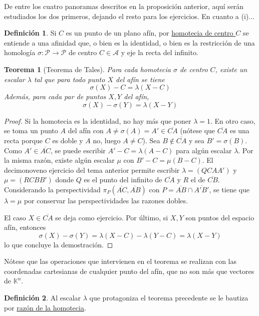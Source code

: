 \documentclass[12pt]{report}
\newtheorem{theorem}{Teorema}[chapter]
\theoremstyle{definition}
\newtheorem{definition}{Definición}[chapter]
\theoremstyle{definition}
\theoremstyle{remark}
\begin{document}
De entre los cuatro panoramas descritos en la proposición anterior, aquí serán estudiados los dos primeros, dejando el resto para los ejercicios. En cuanto a (i)...

\begin{definition}
Si $C$ es un punto de un plano afín, por \ul{homotecia de centro $C$} se entiende a una afinidad que, o bien es la identidad, o bien es la restricción de una homología $\sigma \colon \mathcal{P} \to \mathcal{P}$ de centro $C \in \mathcal{A}$ y eje la recta del infinito.
\end{definition}

\begin{theorem}[Teorema de Tales]
Para cada homotecia $\sigma$ de centro $C$, existe un escalar $\lambda$ tal que para todo punto $X$ del afín se tiene
\[\sigma(X) - C = \lambda(X - C)\]
Además, para cada par de puntos $X,Y$ del afín,
\[\sigma(X)-\sigma(Y)=\lambda(X-Y)\]
\end{theorem}

\begin{proof}
Si la homotecia es la identidad, no hay más que poner $\lambda = 1$. En otro caso, se toma un punto $A$ del afín con $A \neq \sigma(A) =A' \in \overline{CA}$ (nótese que $\overline{CA}$ es una recta porque $C$ es doble y $A$ no, luego $A \neq C$). Sea $B \notin \overline{CA}$ y sea $B' = \sigma(B)$. Como $A' \in \overline{AC}$, se puede escribir $A' - C= \lambda(A-C)$ para algún escalar $\lambda$. Por la misma razón, existe algún escalar $\mu$ con $B'-C=\mu(B-C)$. El decimonoveno ejercicio del tema anterior permite escribir $\lambda = (QCAA')$ y $\mu = (RCBB')$ donde $Q$ es el punto del infinito de $\overline{CA}$ y $R$ el de $\overline{CB}$. Considerando la perspectividad $\pi_P(\overline{AC}, \overline{AB})$ con $P = \overline{AB} \cap \overline{A'B'}$, se tiene que $\lambda = \mu$ por conservar las perspectividades las razones dobles. 

\vspace{2mm}
El caso $X \in \overline{CA}$ se deja como ejercicio. Por último, si $X,Y$ son puntos del espacio afín, entonces
\[\sigma(X)-\sigma(Y)=\lambda(X-C)-\lambda(Y-C)=\lambda(X-Y)\]
lo que concluye la demostración.
\end{proof}

Nótese que las operaciones que intervienen en el teorema se realizan con las coordenadas cartesianas de cualquier punto del afín, que no son más que vectores de $\mathbb{K}^n$.

\begin{definition}
Al escalar $\lambda$ que protagoniza el teorema precedente se le bautiza por \ul{razón de la homotecia}.
\end{definition}
\end{document}
